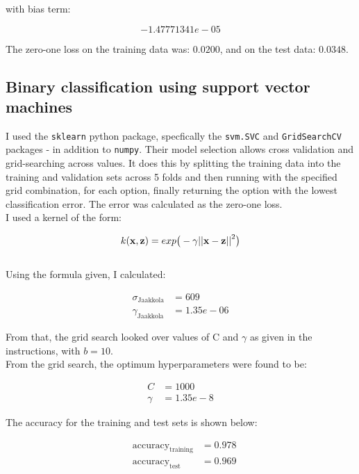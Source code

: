 \documentclass{scrartcl}
\begin{document}
with bias term:

\[ -1.47771341e-05 \]

The zero-one loss on the training data was: $0.0200$, and on the test data: $0.0348$.

\subsection{Binary classification using support vector machines}
I used the \texttt{sklearn} python package, specfically the \texttt{svm.SVC} and \texttt{GridSearchCV} packages - in addition to \texttt{numpy}. Their model selection allows cross validation and grid-searching across values. It does this by splitting the training data into the training and validation sets across 5 folds and then running with the specified grid combination, for each option, finally returning the option with the lowest classification error. The error was calculated as the zero-one loss.\\

I used a kernel of the form:

\[ k({\mathbf x}, {\mathbf z}) = exp \big(-\gamma {|| {\mathbf x}- {\mathbf z}||}^2\big) \] \\

\newpage
Using the formula given, I calculated:

\begin{align*}
    \sigma_{\text{Jaakkola}} &= 609 \\
    \gamma_{\text{Jaakkola}} &= 1.35e-06
\end{align*}

From that, the grid search looked over values of C and $\gamma$ as given in the instructions, with $b = 10$. \\

From the grid search, the optimum hyperparameters were found to be:

\begin{align*}
    C &= 1000 \\
    \gamma &= 1.35e-8
\end{align*}

The accuracy for the training and test sets is shown below:

\begin{align*}
    & \text{accuracy}_{\text{training}}   &= 0.978 \\
    & \text{accuracy}_{\text{test}}       &= 0.969 \\
\end{align*}
\end{document}
